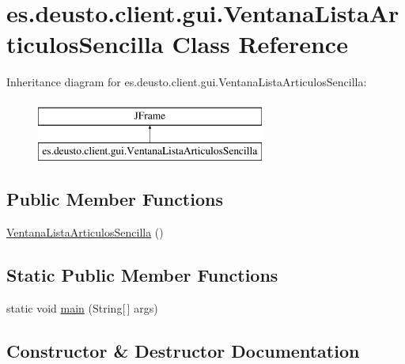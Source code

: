 \hypertarget{classes_1_1deusto_1_1client_1_1gui_1_1_ventana_lista_articulos_sencilla}{}\section{es.\+deusto.\+client.\+gui.\+Ventana\+Lista\+Articulos\+Sencilla Class Reference}
\label{classes_1_1deusto_1_1client_1_1gui_1_1_ventana_lista_articulos_sencilla}
Inheritance diagram for es.\+deusto.\+client.\+gui.\+Ventana\+Lista\+Articulos\+Sencilla\+:\begin{figure}[H]
\begin{center}
\leavevmode
\includegraphics[height=2.000000cm]{classes_1_1deusto_1_1client_1_1gui_1_1_ventana_lista_articulos_sencilla}
\end{center}
\end{figure}
\subsection*{Public Member Functions}
\begin{DoxyCompactItemize}
\item 
\mbox{\hyperlink{classes_1_1deusto_1_1client_1_1gui_1_1_ventana_lista_articulos_sencilla_a7a951aa40c6fb7c6bed126158df1332e}{Ventana\+Lista\+Articulos\+Sencilla}} ()
\end{DoxyCompactItemize}
\subsection*{Static Public Member Functions}
\begin{DoxyCompactItemize}
\item 
static void \mbox{\hyperlink{classes_1_1deusto_1_1client_1_1gui_1_1_ventana_lista_articulos_sencilla_a23845d0a41b2598ae3d319bc7337d08d}{main}} (String\mbox{[}$\,$\mbox{]} args)
\end{DoxyCompactItemize}


\subsection{Constructor \& Destructor Documentation}
\mbox{\label{classes_1_1deusto_1_1client_1_1gui_1_1_ventana_lista_articulos_sencilla_a7a951aa40c6fb7c6bed126158df1332e}} 
